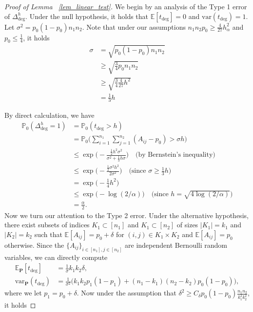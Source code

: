\documentclass{article}
\newcommand{\bbP}{\mathbb{P}}
\newcommand{\bP}{\mathbf{P}}
\newcommand{\EE}{\mathbb{E}}
\newcommand{\var}{\textrm{var}}
\newcommand{\lin}{\text{deg}}
\begin{document}
\begin{proof}[Proof of Lemma ~\ref{lem_linear_test}]
    We begin by an analysis of the Type 1 error of $\Delta_\lin^h$. Under the null hypothesis, it holds that $\EE[t_\lin] = 0$ and $\var(t_\lin) = 1$. Let $\sigma^2 = p_0(1-p_0)n_1n_2$. Note that under our assumptions $n_1n_2p_0 \geq \frac{4}{27}h_\alpha^2$ and $p_0 \leq \frac14$, it holds
    \begin{align*}
        \sigma &= \sqrt{p_0(1-p_0)n_1n_2} \\
        &\geq \sqrt{\frac34p_0n_1n_2} \\
        &\geq \sqrt{\frac34\frac{4}{27}h^2} \\
        &= \frac13 h
    \end{align*}
    
    By direct calculation, we have
    \begin{align*}
        \bbP_0(\Delta_\lin^h = 1) &= \bbP_0(t_\lin > h) \\
        &= \bbP_0\big(\sum_{i = 1}^{n_1}\sum_{j = 1}^{n_2}(A_{ij} - p_0) > \sigma h\big) \\
        &\leq \exp\Big(-\frac{\frac12h^2\sigma^2}{\sigma^2 + \frac13h\sigma}\Big) \quad \text{(by Bernstein's inequality)} \\
        &\leq \exp\Big(-\frac{\frac12 \sigma^2 h^2}{2\sigma^2}\Big) \quad \text{(since $\sigma \geq \frac13 h$)} \\
        &= \exp\Big(-\frac14 h^2\Big)\\
        &\leq \exp\big(- \log(2/\alpha)\big) \quad \text{(since $h = \sqrt{4\log(2/\alpha)}$)} \\
        &= \frac{\alpha}{2}.
    \end{align*}
    Now we turn our attention to the Type 2 error. Under the alternative hypothesis, there exist subsets of indices $K_1 \subset [n_1]$ and $K_1 \subset [n_2]$ of sizes $|K_1| = k_1$ and $|K_2| = k_2$ such that $\EE[A_{ij}] = p_0 + \delta$ for $(i,j) \in K_1 \times K_2$ and $\EE[A_{ij}] = p_0$ otherwise. Since the $\{A_{ij}\}_{i \in[n_1] ,j\in [n_2]}$ are independent Bernoulli random variables, we can directly compute
    \begin{align*}
        \EE_\bP[t_\lin] &= \frac{1}{\sigma}k_1k_2 \delta, \\
        \var_\bP(t_\lin) &= \frac{1}{\sigma^2}\big(k_1k_2 p_1(1 - p_1) + (n_1 - k_1)(n_2 - k_2)p_0(1 - p_0)\big),
    \end{align*}
    where we let $p_1 = p_0 + \delta$. Now under the assumption that $\delta^2 \geq C_\delta p_0(1-p_0)\frac{n_1n_2}{k_1^2k_2^2}$, it holds

\end{proof}
\end{document}
